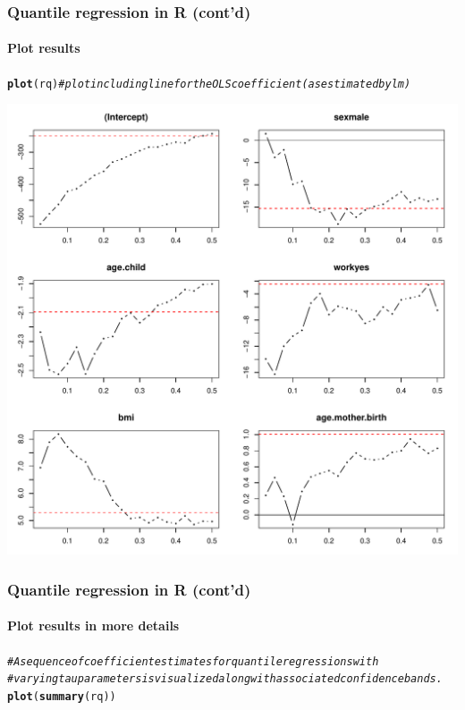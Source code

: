 \documentclass{beamer}\usepackage[]{graphicx}\usepackage[]{color}
\makeatletter
\newcommand{\hlcom}[1]{\textcolor[rgb]{0.678,0.584,0.686}{\textit{#1}}}%
\newcommand{\hlstd}[1]{\textcolor[rgb]{0.345,0.345,0.345}{#1}}%
\newcommand{\hlkwd}[1]{\textcolor[rgb]{0.737,0.353,0.396}{\textbf{#1}}}%
\newenvironment{kframe}{%
 \def\at@end@of@kframe{}%
 \ifinner\ifhmode%
  \def\at@end@of@kframe{\end{minipage}}%
  \begin{minipage}{\columnwidth}%
 \fi\fi%
 \def\FrameCommand##1{\hskip\@totalleftmargin \hskip-\fboxsep
 \colorbox{shadecolor}{##1}\hskip-\fboxsep
     \hskip-\linewidth \hskip-\@totalleftmargin \hskip\columnwidth}%
 \MakeFramed {\advance\hsize-\width
   \@totalleftmargin\z@ \linewidth\hsize
   \@setminipage}}%
 {\par\unskip\endMakeFramed%
 \at@end@of@kframe}
\newenvironment{knitrout}{}{} %
\makeatother
\begin{document}
{{{
\begin{frame}[fragile]
\frametitle{Quantile regression in R (cont'd)}
\framesubtitle{Plot results}
\begin{knitrout}\tiny
{}\color{fgcolor}\begin{kframe}
\begin{alltt}
\hlkwd{plot}\hlstd{(rq)} \hlcom{# plot including line for the OLS coefficient (as estimated by lm)}
\end{alltt}
\end{kframe}

{\centering \includegraphics[width=0.6\linewidth]{figure/unnamed-chunk-89-1} 

}



\end{knitrout}
\end{frame}

\begin{frame}[fragile]
\frametitle{Quantile regression in R (cont'd)}
\framesubtitle{Plot results in more details}
\begin{knitrout}\tiny
{}\color{fgcolor}\begin{kframe}
\begin{alltt}
\hlcom{# A sequence of coefficient estimates for quantile regressions with}
\hlcom{# varying tau parameters is visualized along with associated confidence bands.}
\hlkwd{plot}\hlstd{(}\hlkwd{summary}\hlstd{(rq))}
\end{alltt}
\end{kframe}


\end{knitrout}
\end{frame}}}}
\end{document}
